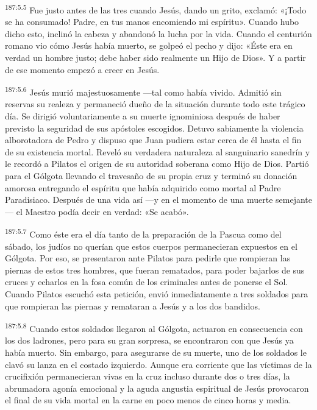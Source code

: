 \par 
\textsuperscript{187:5.5} Fue justo antes de las tres cuando Jesús, dando un grito, exclamó: «¡Todo se ha consumado! Padre, en tus manos encomiendo mi espíritu». Cuando hubo dicho esto, inclinó la cabeza y abandonó la lucha por la vida. Cuando el centurión romano vio cómo Jesús había muerto, se golpeó el pecho y dijo: «Éste era en verdad un hombre justo; debe haber sido realmente un Hijo de Dios». Y a partir de ese momento empezó a creer en Jesús.

\par 
\textsuperscript{187:5.6} Jesús murió majestuosamente ---tal como había vivido. Admitió sin reservas su realeza y permaneció dueño de la situación durante todo este trágico día. Se dirigió voluntariamente a su muerte ignominiosa después de haber previsto la seguridad de sus apóstoles escogidos. Detuvo sabiamente la violencia alborotadora de Pedro y dispuso que Juan pudiera estar cerca de él hasta el fin de su existencia mortal. Reveló su verdadera naturaleza al sanguinario sanedrín y le recordó a Pilatos el origen de su autoridad soberana como Hijo de Dios. Partió para el Gólgota llevando el travesaño de su propia cruz y terminó su donación amorosa entregando el espíritu que había adquirido como mortal al Padre Paradisiaco. Después de una vida así ---y en el momento de una muerte semejante--- el Maestro podía decir en verdad: «Se acabó».

\par 
\textsuperscript{187:5.7} Como éste era el día tanto de la preparación de la Pascua como del sábado, los judíos no querían que estos cuerpos permanecieran expuestos en el Gólgota. Por eso, se presentaron ante Pilatos para pedirle que rompieran las piernas de estos tres hombres, que fueran rematados, para poder bajarlos de sus cruces y echarlos en la fosa común de los criminales antes de ponerse el Sol. Cuando Pilatos escuchó esta petición, envió inmediatamente a tres soldados para que rompieran las piernas y remataran a Jesús y a los dos bandidos.

\par 
\textsuperscript{187:5.8} Cuando estos soldados llegaron al Gólgota, actuaron en consecuencia con los dos ladrones, pero para su gran sorpresa, se encontraron con que Jesús ya había muerto. Sin embargo, para asegurarse de su muerte, uno de los soldados le clavó su lanza en el costado izquierdo. Aunque era corriente que las víctimas de la crucifixión permanecieran vivas en la cruz incluso durante dos o tres días, la abrumadora agonía emocional y la aguda angustia espiritual de Jesús provocaron el final de su vida mortal en la carne en poco menos de cinco horas y media.


